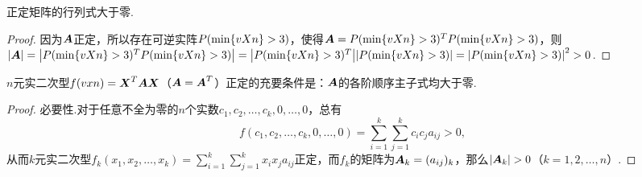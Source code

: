 \begin{corollary}
正定矩阵的行列式大于零.
\begin{proof}
因为\(\A\)正定，所以存在可逆实阵\(\P\)，使得\(\A=\P^T\P\)，则\(\abs{\A}=\abs{\P^T\P}=\abs{\P^T}\abs{\P}=\abs{\P}^2>0\).
\end{proof}
\end{corollary}

\begin{theorem}
\(n\)元实二次型\(f(\v{x}{n}) = \x^T\A\x\)（\(\A=\A^T\)）正定的充要条件是：\(\A\)的各阶顺序主子式均大于零.
\begin{proof}
必要性.对于任意不全为零的\(n\)个实数\(c_1,c_2,\dotsc,c_k,0,\dotsc,0\)，总有\[
f(c_1,c_2,\dotsc,c_k,0,\dotsc,0) = \sum\limits_{i=1}^k \sum\limits_{j=1}^k c_i c_j a_{ij} > 0,
\]从而\(k\)元实二次型\(f_k(x_1,x_2,\dotsc,x_k) = \sum\limits_{i=1}^k \sum\limits_{j=1}^k x_i x_j a_{ij}\)正定，而\(f_k\)的矩阵为\(\A_k = (a_{ij})_k\)，那么\(\abs{\A_k} > 0\)（\(k=1,2,\dotsc,n\)）.


\end{proof}
\end{theorem}
